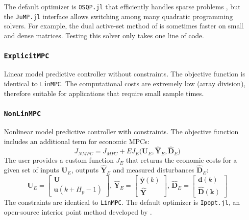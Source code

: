 The default optimizer is \texttt{OSQP.jl} that efficiently handles sparse problems \citep{osqp}, but the \texttt{JuMP.jl} interface allows switching among many quadratic programming solvers. For example, the dual active-set method of \citet{daqp} is sometimes faster on small and dense matrices. Testing this solver only takes one line of code.

\subsubsection{\textnormal{\texttt{ExplicitMPC}}}
Linear model predictive controller without constraints. The objective function is identical
to \texttt{LinMPC}. The computational costs are extremely low (array division), therefore suitable for applications that require small sample times.

\subsubsection{\textnormal{\texttt{NonLinMPC}}}
Nonlinear model predictive controller with constraints. The objective function includes an additional term for economic MPCs:
\begin{equation}
J_{\mathit{NMPC}} = J_{\mathit{MPC}} 
    + E J_E\big(\mathbf{U}_E, \mathbf{\hat{Y}}_E, \mathbf{\hat{D}}_E\big)
\end{equation}
The user provides a custom function $J_E$ that returns the economic costs for a given set of inputs $\mathbf{U}_E$, outputs $\mathbf{\hat{Y}}_E$ and measured disturbances $\mathbf{\hat{D}}_E$:
\begin{equation}
\mathbf{U}_E = 
\begin{bmatrix}
    \mathbf{U} \\ \mathbf{u}(k+H_p-1)
\end{bmatrix}\!,\,
\mathbf{\hat{Y}}_E = 
\begin{bmatrix}
    \mathbf{\hat{y}}(k) \\ \mathbf{\hat{Y}}
\end{bmatrix}\!,\, 
\mathbf{\hat{D}}_E = 
\begin{bmatrix}
    \mathbf{d}(k) \\ \mathbf{\hat{D}(k)}
\end{bmatrix} 
\end{equation} 
The constraints are identical to \texttt{LinMPC}. The default optimizer is \texttt{Ipopt.jl}, an open-source interior point method developed by \citet{ipopt}.



